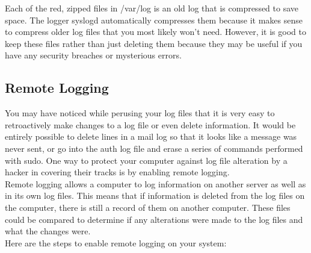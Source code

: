 \documentclass{article}
\begin{document}
Each of the red, zipped files in /var/log is an old log that is compressed to save space. The logger syslogd automatically compresses them because it makes sense to compress older log files that you most likely won't need. However, it is good to keep these files rather than just deleting them because they may be useful if you have any security breaches or mysterious errors.


\subsection*{Remote Logging}

\indent\indent You may have noticed while perusing your log files that it is very easy to retroactively make changes to a log file or even delete information. It would be entirely possible to delete lines in a mail log so that it looks like a message was never sent, or go into the auth log file and erase a series of commands performed with sudo. One  way to protect your computer against log file alteration by a hacker in covering their tracks is by enabling remote logging. \\

Remote logging allows a computer to log information on another server as well as in its own log files. This means that if information is deleted from the log files on the computer, there is still a record of them  on another computer. These files could be compared to determine if any alterations were made to the log files and what the changes were. \\

Here are the steps to enable remote logging on your system:
\end{document}
